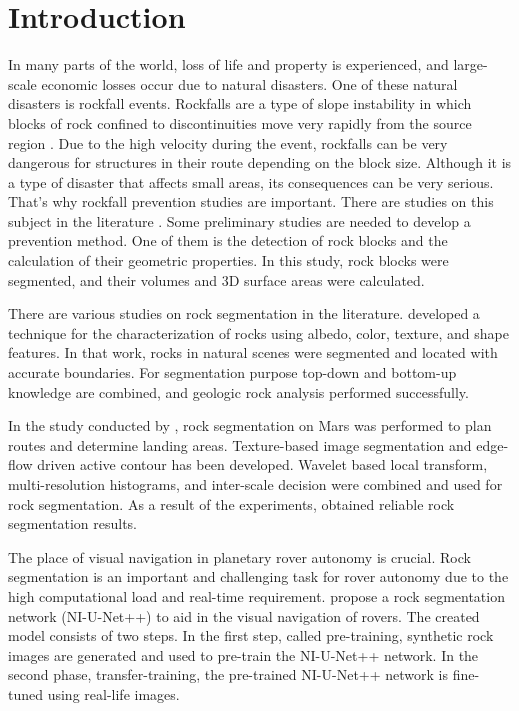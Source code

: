 \documentclass[a4paper,fleqn]{cas-sc}
\begin{document}
\maketitle 

\printcredits

\doublespacing


\section{Introduction}
\label{intro}
In many parts of the world, loss of life and property is experienced, and large-scale economic losses occur due to natural disasters. One of these natural disasters is rockfall events. Rockfalls are a type of slope instability in which blocks of rock confined to discontinuities move very rapidly from the source region \citep{varnes1978slope, hutchinson1988morphological, CrudenVarnes1996}. Due to the high velocity during the event, rockfalls can be very dangerous for structures in their route depending on the block size. Although it is a type of disaster that affects small areas, its consequences can be very serious. That's why rockfall prevention studies are important. There are studies on this subject in the literature \citep{liu2021trajectory, keskin2022kinematic,ji2023assessment,kainthola2023stability, cao2024risk}. Some preliminary studies are needed to develop a prevention method. One of them is the detection of rock blocks and the calculation of their geometric properties. In this study, rock blocks were segmented, and their volumes and 3D surface areas were calculated. 

There are various studies on rock segmentation in the literature. \cite{dunlop2006automatic} developed a technique for the characterization of rocks using albedo, color, texture, and shape features. In that work, rocks in natural scenes were segmented and located with accurate boundaries. For segmentation purpose top-down and bottom-up knowledge are combined, and geologic rock analysis performed successfully.

In the study conducted by \cite{Song2006AFF}, rock segmentation on Mars was performed to plan routes and determine landing areas. Texture-based image segmentation and edge-flow driven active contour has been developed. Wavelet based local transform, multi-resolution histograms, and inter-scale decision were combined and used for rock segmentation. As a result of the experiments, \cite{Song2006AFF} obtained reliable rock segmentation results.

The place of visual navigation in planetary rover autonomy is crucial. Rock segmentation is an important and challenging task for rover autonomy due to the high computational load and real-time requirement. \cite{kuang2021rock} propose a rock segmentation network (NI-U-Net++) to aid in the visual navigation of rovers. The created model consists of two steps. In the first step, called pre-training, synthetic rock images are generated and used to pre-train the NI-U-Net++ network. In the second phase, transfer-training, the pre-trained NI-U-Net++ network is fine-tuned using real-life images.
\end{document}
